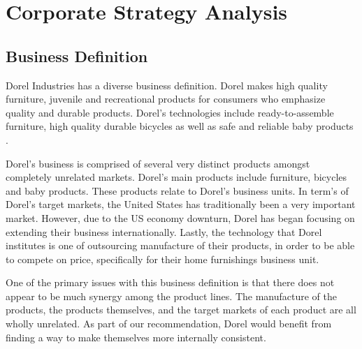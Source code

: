 \chapter{Corporate Strategy Analysis}
\label{chp:corporatestrategy}

\section{Business Definition}

Dorel Industries has a diverse business definition.   Dorel makes high quality furniture, juvenile and recreational products for consumers who emphasize quality and durable products.  Dorel’s technologies include ready-to-assemble furniture, high quality durable bicycles as well as safe and reliable baby products \cite{DorelIndustries2013}.

Dorel’s business is comprised of several very distinct products amongst completely unrelated markets. Dorel’s main products include furniture, bicycles and baby products.  These products relate to Dorel’s business units.   In term’s of Dorel’s target markets, the United States has traditionally been a very important market. However, due to the US economy downturn, Dorel has began focusing on extending their business internationally.  Lastly, the technology that Dorel institutes is one of outsourcing manufacture of their products, in order to be able to compete on price, specifically for their home furnishings business unit.

One of the primary issues with this business definition is that there does not appear to be much synergy among the product lines. The manufacture of the products, the products themselves, and the target markets of each product are all wholly unrelated. As part of our recommendation, Dorel would benefit from finding a way to make themselves more internally consistent.

